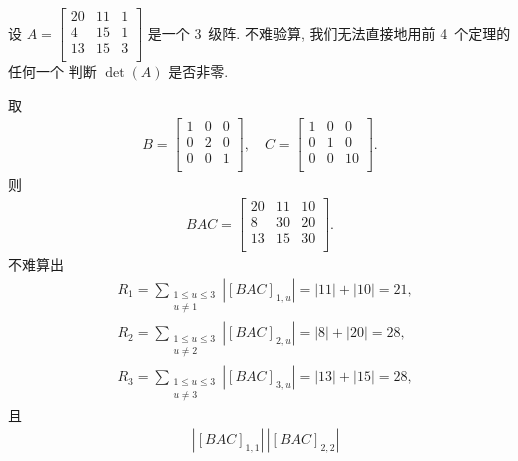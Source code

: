 \begin{example}\label{emp:NonzeroDet2}
    设 \(A =
    \begin{bmatrix}
        20 & 11 & 1 \\
        4  & 15 & 1 \\
        13 & 15 & 3 \\
    \end{bmatrix}\)
    是一个 \(3\)~级阵.
    不难验算, 我们无法直接地用前 4~个定理的任何一个%
    判断 \(\det {(A)}\) 是否非零.

    取
    \begin{align*}
        B = \begin{bmatrix}
                1 & 0 & 0 \\
                0 & 2 & 0 \\
                0 & 0 & 1 \\
            \end{bmatrix},
        \quad
        C = \begin{bmatrix}
                1 & 0 & 0  \\
                0 & 1 & 0  \\
                0 & 0 & 10 \\
            \end{bmatrix}.
    \end{align*}
    则
    \begin{align*}
        BAC = \begin{bmatrix}
                  20 & 11 & 10 \\
                  8  & 30 & 20 \\
                  13 & 15 & 30 \\
              \end{bmatrix}.
    \end{align*}
    不难算出
    \begin{align*}
         & R_1 = \sum_{\substack{1 \leq u \leq 3 \\u \neq 1}}
        {|[BAC]_{1,u}|} = |11| + |10| = 21,      \\
         & R_2 = \sum_{\substack{1 \leq u \leq 3 \\u \neq 2}}
        {|[BAC]_{2,u}|} = |8| + |20| = 28,       \\
         & R_3 = \sum_{\substack{1 \leq u \leq 3 \\u \neq 3}}
        {|[BAC]_{3,u}|} = |13| + |15| = 28,
    \end{align*}
    且
    \begin{align*}
         & |[BAC]_{1,1}|\,|[BAC]_{2,2}|

\end{align*}
\end{example}
